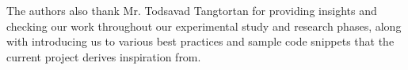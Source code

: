 \documentclass[11pt]{article}
\begin{document}
The authors also thank Mr. Todsavad Tangtortan for providing insights and checking our work throughout our experimental study and research phases, along with introducing us to various best practices and sample code snippets that the current project derives inspiration from.

%
%




\end{document}
